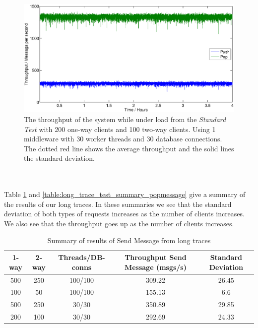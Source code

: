 \documentclass{article}
\begin{document}
            \begin{figure}[H]
                \hspace{-4.5cm}
                \includegraphics[scale=0.750]{4h_throughput}
                \caption{The throughput of the system while under load from the \textit{Standard Test} with 200 one-way clients and 100 two-way clients. Using 1 middleware with 30 worker threads and 30 database connections. The dotted red line shows the average throughput and the solid lines the standard deviation.}
                \label{fig:4h_throughput}
            \end{figure}
            ~\\
            ~\\
            Table \ref{table:long_trace_test_summary_sendmessage} and \ref{table:long_trace_test_summary_popmessage} give a summary of the results of our long traces. In these summaries we see that the standard deviation of both types of requests increases as the number of clients increases. We also see that the throughput goes up as the number of clients increases.

            \begin{table}[H]
                \caption{Summary of results of Send Message from long traces}
                \label{table:long_trace_test_summary_sendmessage}
                \begin{adjustwidth}{-2cm}{}
                    \begin{tabular}{|c|c|c|c|c|}
                        \hline 
                        \textbf{1-way} & \textbf{2-way} & \textbf{Threads/DB-conns} & \textbf{Throughput Send Message (msgs/s)} & \textbf{Standard Deviation}\\ 
                        \hline 
                        500 & 250 & 100/100 &309.22 &26.45\\
                        \hline
                        100 & 50 & 100/100 &155.13 &6.6\\
                        \hline 
                        500 & 250 & 30/30 &350.89 &29.85\\
                        \hline
                        200 & 100 & 30/30 &292.69 &24.33\\
                        \hline
                    \end{tabular} 
                \end{adjustwidth}
            \end{table}
\end{document}
